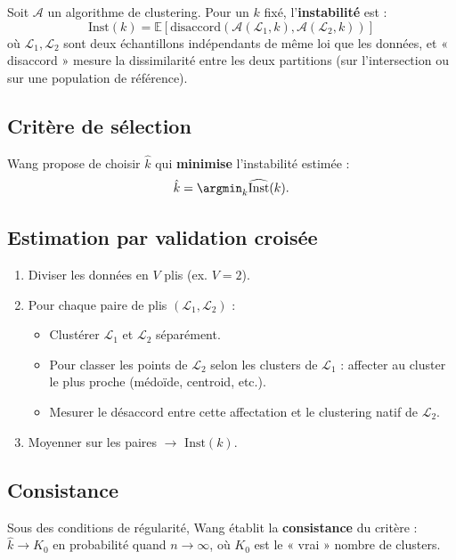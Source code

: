 \documentclass[11pt, a4paper]{article}
\newcommand{\E}{\mathbb{E}}
\begin{document}
Soit $\mathcal{A}$ un algorithme de clustering. Pour un $k$ fixé, l'\textbf{instabilité} est :
\[
  \text{Inst}(k) = \E\left[ \text{disaccord}(\mathcal{A}(\mathcal{L}_1, k), \mathcal{A}(\mathcal{L}_2, k)) \right]
\]
où $\mathcal{L}_1, \mathcal{L}_2$ sont deux échantillons indépendants de même loi que les données, et « disaccord » mesure la dissimilarité entre les deux partitions (sur l'intersection ou sur une population de référence).

\subsection{Critère de sélection}

Wang propose de choisir $\hat{k}$ qui \textbf{minimise} l'instabilité estimée :
\[
  \hat{k} = \argmin_{k} \widehat{\text{Inst}}(k).
\]

\subsection{Estimation par validation croisée}

\begin{enumerate}
  \item Diviser les données en $V$ plis (ex. $V=2$).
  \item Pour chaque paire de plis $(\mathcal{L}_1, \mathcal{L}_2)$ :
  \begin{itemize}
    \item Clustérer $\mathcal{L}_1$ et $\mathcal{L}_2$ séparément.
    \item Pour classer les points de $\mathcal{L}_2$ selon les clusters de $\mathcal{L}_1$ : affecter au cluster le plus proche (médoïde, centroid, etc.).
    \item Mesurer le désaccord entre cette affectation et le clustering natif de $\mathcal{L}_2$.
  \end{itemize}
  \item Moyenner sur les paires $\to$ $\widehat{\text{Inst}}(k)$.
\end{enumerate}

\subsection{Consistance}

Sous des conditions de régularité, Wang établit la \textbf{consistance} du critère : $\hat{k} \to K_0$ en probabilité quand $n \to \infty$, où $K_0$ est le « vrai » nombre de clusters.
\end{document}
